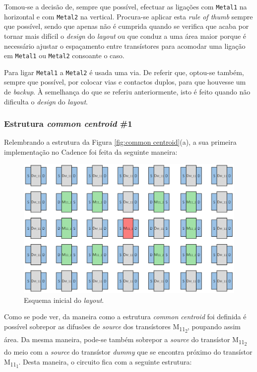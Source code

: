 \documentclass[11pt]{article}
\numberwithin{equation}{section}
\begin{document}
Tomou-se a decisão de, sempre que possível, efectuar as ligações com \texttt{Metal1} na horizontal e com \texttt{Metal2} na vertical. Procura-se aplicar esta \textit{rule of thumb} sempre que possível, sendo que apenas não é cumprida quando se verifica que acaba por tornar mais difícil o \textit{design} do \textit{layout} ou que conduz a uma área maior porque é necessário ajustar o espaçamento entre transístores para acomodar uma ligação em \texttt{Metal1} ou \texttt{Metal2} consoante o caso.

Para ligar \texttt{Metal1} a \texttt{Metal2} é usada uma via. De referir que, optou-se também, sempre que possível, por colocar vias e contactos duplos, para que houvesse um de \textit{backup}. À semelhança do que se referiu anteriormente, isto é feito quando não dificulta o \textit{design} do \textit{layout}.

\subsubsection{Estrutura \textit{common centroid} \#1}

Relembrando a estrutura da Figura \ref{fig:common centroid}(a), a sua primeira implementação no Cadence foi feita da seguinte maneira:

\begin{figure}[H]
	\centering
	\includegraphics[keepaspectratio=true, scale=0.30]{teoricas/layout/cc1_1}
	\vspace{-0.5em}
	\caption{Esquema inicial do \textit{layout}.}
	\vspace{-0.8em} 
\end{figure}

Como se pode ver, da maneira como a estrutura \textit{common centroid} foi definida é possível sobrepor as difusões de \textit{source} dos transístores M\textsubscript{11\textsubscript{2}}, poupando assim área. Da mesma maneira, pode-se também sobrepor a \textit{source} do transístor M\textsubscript{11\textsubscript{2}} do meio com a \textit{source} do transístor \textit{dummy} que se encontra próximo do transístor M\textsubscript{11\textsubscript{1}}. Desta maneira, o circuito fica com a seguinte estrutura:
\end{document}

